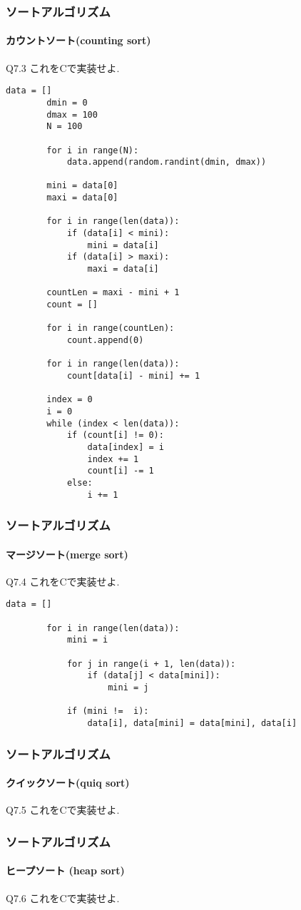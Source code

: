 \documentclass[dvipdfmx]{beamer}
\begin{document}
\begin{frame}
    \frametitle{ソートアルゴリズム}
    \framesubtitle{カウントソート(counting sort)}
    \begin{itembox}[l]{Q7.3}
        これをCで実装せよ.
    \end{itembox}
    \begin{lstlisting}[gobble=8, caption=countingSort.py, label=countingSort]
        data = []
        dmin = 0
        dmax = 100
        N = 100

        for i in range(N):
            data.append(random.randint(dmin, dmax))

        mini = data[0]
        maxi = data[0]

        for i in range(len(data)):
            if (data[i] < mini):
                mini = data[i]
            if (data[i] > maxi):
                maxi = data[i]

        countLen = maxi - mini + 1
        count = []

        for i in range(countLen):
            count.append(0)

        for i in range(len(data)):
            count[data[i] - mini] += 1

        index = 0
        i = 0
        while (index < len(data)):
            if (count[i] != 0):
                data[index] = i
                index += 1
                count[i] -= 1
            else:
                i += 1
    \end{lstlisting}
\end{frame}

\begin{frame}[t, fragile]
    \frametitle{ソートアルゴリズム}
    \framesubtitle{マージソート(merge sort)}
    \begin{itembox}[l]{Q7.4}
        これをCで実装せよ.
    \end{itembox}
    \begin{lstlisting}[gobble=8, caption=mergeSort.py, label=mergeSort]
        data = []

        for i in range(len(data)):
            mini = i

            for j in range(i + 1, len(data)):
                if (data[j] < data[mini]):
                    mini = j

            if (mini !=  i):
                data[i], data[mini] = data[mini], data[i]
    \end{lstlisting}
\end{frame}

\begin{frame}[t, fragile]
    \frametitle{ソートアルゴリズム}
    \framesubtitle{クイックソート(quiq sort)}
    \begin{itembox}[l]{Q7.5}
        これをCで実装せよ.
    \end{itembox}
\end{frame}

\begin{frame}[t, fragile]
    \frametitle{ソートアルゴリズム}
    \framesubtitle{ヒープソート (heap sort)}
    \begin{itembox}[l]{Q7.6}
        これをCで実装せよ.
    \end{itembox}
\end{frame}
\end{document}
